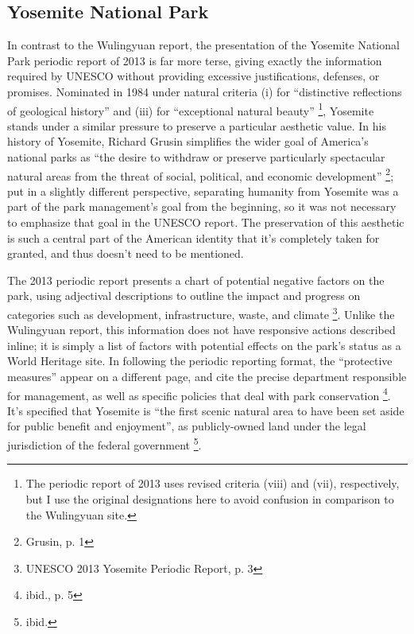 \subsection*{Yosemite National Park}

In contrast to the Wulingyuan report, the presentation of the Yosemite National
Park periodic report of 2013 is far more terse, giving exactly the information
required by UNESCO without providing excessive justifications, defenses, or
promises. Nominated in 1984 under natural criteria (i) for ``distinctive
reflections of geological history'' and (iii) for ``exceptional natural
beauty'' \footnote{The periodic report of 2013 uses revised criteria (viii) and
  (vii), respectively, but
I use the original designations here to avoid confusion in comparison to the
Wulingyuan site.}, Yosemite stands under a similar pressure to preserve a
particular aesthetic value. In his
history of Yosemite, Richard Grusin simplifies the wider goal of America's
national parks as ``the desire to withdraw or preserve particularly spectacular
natural areas from the threat of social, political, and economic development''
\footnote{Grusin, p. 1}; put in a slightly different perspective, separating
humanity from Yosemite was a part of the park management's goal from the
beginning, so it was not necessary to emphasize that goal in the UNESCO
report. The preservation of this aesthetic is such a central part of the
American identity that it's completely taken for granted, and thus doesn't need
to be mentioned.

The 2013 periodic report presents a chart of potential negative factors on the
park, using adjectival descriptions to outline the impact and progress on
categories such as development, infrastructure, waste, and climate
\footnote{UNESCO 2013 Yosemite Periodic Report, p. 3}. Unlike the Wulingyuan
report, this information does not have responsive actions described inline; it
is simply a list of factors with potential effects on the park's status as a
World Heritage site. In following the periodic reporting format, the
``protective measures'' appear on a different page, and cite the precise
department responsible for management, as well as specific policies that deal with
park conservation \footnote{ibid., p. 5}. It's specified that Yosemite is ``the
first scenic natural area to have been set aside for public benefit and
enjoyment'', as publicly-owned land under the legal jurisdiction of the federal
government \footnote{ibid.}.

